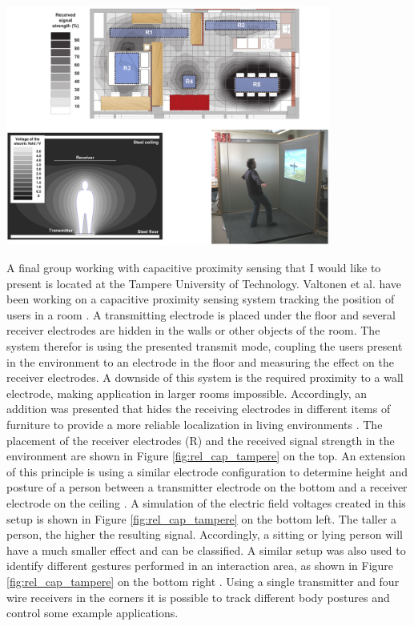 \begin{minipage}{\linewidth}
\centering
\includegraphics[width=0.8\textwidth]{images/rel_cap_tampere}
\label{fig:rel_cap_tampere}
\end{minipage}

A final group working with capacitive proximity sensing that I would like to present is located at the Tampere University of Technology. Valtonen et al. have been working on a capacitive proximity sensing system tracking the position of users in a room \cite{Valtonen2009a,valtonen2012capacitive}. A transmitting electrode is placed under the floor and several receiver electrodes are hidden in the walls or other objects of the room. The system therefor is using the presented transmit mode, coupling the users present in the environment to an electrode in the floor and measuring the effect on the receiver electrodes. A downside of this system is the required proximity to a wall electrode, making application in larger rooms impossible. Accordingly, an addition was presented that hides the receiving electrodes in different items of furniture to provide a more reliable localization in living environments \cite{valtonen2012capacitive}. The placement of the receiver electrodes (R) and the received signal strength in the environment are shown in Figure \ref{fig:rel_cap_tampere} on the top. An extension of this principle is using a similar electrode configuration to  determine height and posture of a person between a transmitter electrode on the bottom and a receiver electrode on the ceiling \cite{valtonen2011unobtrusive}. A simulation of the electric field voltages created in this setup is shown in Figure \ref{fig:rel_cap_tampere} on the bottom left. The taller a person, the higher the resulting signal. Accordingly, a sitting or lying person will have a much smaller effect and can be classified. A similar setup was also used to identify different gestures performed in an interaction area, as shown in Figure \ref{fig:rel_cap_tampere} on the bottom right \cite{valtonen2010human}. Using a single transmitter and four wire receivers in the corners it is possible to track different body postures and control some example applications.


